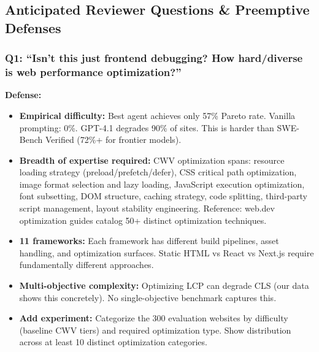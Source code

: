 \subsection{Anticipated Reviewer Questions \& Preemptive Defenses}

\subsubsection{Q1: ``Isn't this just frontend debugging? How hard/diverse is web performance optimization?''}
\textbf{Defense:}
\begin{itemize}
    \item \textbf{Empirical difficulty:} Best agent achieves only 57\% Pareto rate. Vanilla prompting: 0\%. GPT-4.1 degrades 90\% of sites. This is harder than SWE-Bench Verified (72\%+ for frontier models).
    \item \textbf{Breadth of expertise required:} CWV optimization spans: resource loading strategy (preload/prefetch/defer), CSS critical path optimization, image format selection and lazy loading, JavaScript execution optimization, font subsetting, DOM structure, caching strategy, code splitting, third-party script management, layout stability engineering. Reference: web.dev optimization guides catalog 50+ distinct optimization techniques. 
    \item \textbf{11 frameworks:} Each framework has different build pipelines, asset handling, and optimization surfaces. Static HTML vs React vs Next.js require fundamentally different approaches.
    \item \textbf{Multi-objective complexity:} Optimizing LCP can degrade CLS (our data shows this concretely). No single-objective benchmark captures this.
    \item \textbf{Add experiment:} Categorize the 300 evaluation websites by difficulty (baseline CWV tiers) and required optimization type. Show distribution across at least 10 distinct optimization categories. 
\end{itemize}

